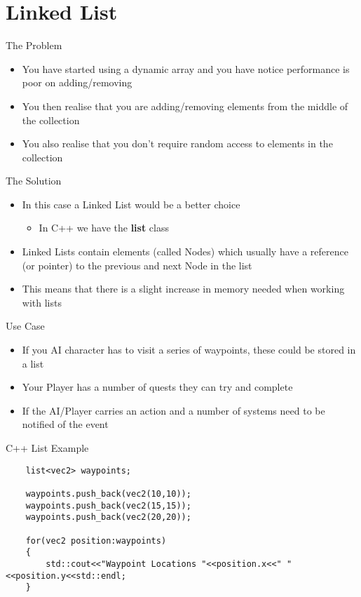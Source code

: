 \part{Linked List}
\frame{\partpage}

\begin{frame}{The Problem}
	\begin{itemize}
		\pause \item You have started using a dynamic array and you have notice performance is poor on adding/removing
		 \pause \item You then realise that you are adding/removing elements from the middle of the collection
		 \pause \item You also realise that you don't require random access to elements in the collection
	\end{itemize}
\end{frame}

\begin{frame}{The Solution}
	\begin{itemize}
		\pause \item In this case a Linked List would be a better choice
		\begin{itemize}
			\pause \item In C++ we have the \textbf{list} class
		\end{itemize}
		\pause \item Linked Lists contain elements (called Nodes) which usually have a reference (or pointer) to the previous and next Node in the list
		\pause \item This means that there is a slight increase in memory needed when working with lists
	\end{itemize}
\end{frame}

\begin{frame}{Use Case}
	\begin{itemize}
		\pause \item If you AI character has to visit a series of waypoints, these could be stored in a list
		\pause \item Your Player has a number of quests they can try and complete
		\pause \item If the AI/Player carries an action and a number of systems need to be notified of the event 
	\end{itemize}
\end{frame}

\begin{frame}[fragile]{C++ List
Example}
\begin{lstlisting}
	list<vec2> waypoints;
	
	waypoints.push_back(vec2(10,10));
	waypoints.push_back(vec2(15,15));
	waypoints.push_back(vec2(20,20));
	
	for(vec2 position:waypoints)
	{
		std::cout<<"Waypoint Locations "<<position.x<<" "<<position.y<<std::endl;
	}
\end{lstlisting}
\end{frame}

